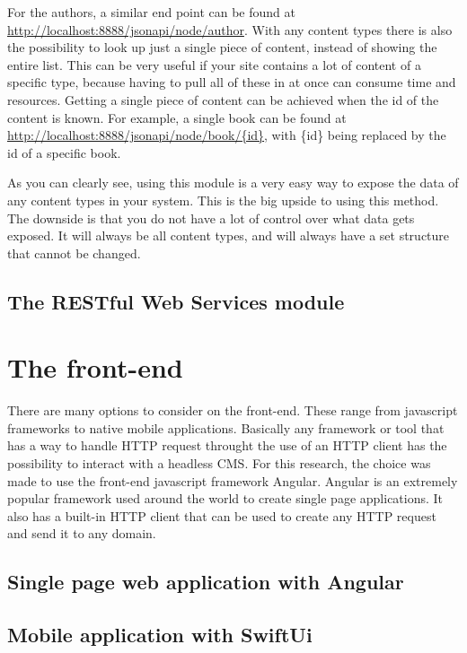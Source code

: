 For the authors, a similar end point can be found at \url{http://localhost:8888/jsonapi/node/author}. With any content types there is also the possibility to look up just a single piece of content, instead of showing the entire list. This can be very useful if your site contains a lot of content of a specific type, because having to pull all of these in at once can consume time and resources. Getting a single piece of content can be achieved when the id of the content is known. For example, a single book can be found at \url{http://localhost:8888/jsonapi/node/book/{id}}, with \{id\} being replaced by the id of a specific book.

As you can clearly see, using this module is a very easy way to expose the data of any content types in your system. This is the big upside to using this method. The downside is that you do not have a lot of control over what data gets exposed. It will always be all content types, and will always have a set structure that cannot be changed.


\subsection{The  RESTful Web Services module}



\section{The front-end}

There are many options to consider on the front-end. These range from javascript frameworks to native mobile applications. Basically any framework or tool that has a way to handle HTTP request throught the use of an HTTP client has the possibility to interact with a headless CMS. For this research, the choice was made to use the front-end javascript framework Angular. Angular is an extremely popular framework used around the world to create single page applications. It also has a built-in HTTP client that can be used to create any HTTP request and send it to any domain.

\subsection{Single page web application with Angular}

\subsection{Mobile application with SwiftUi}